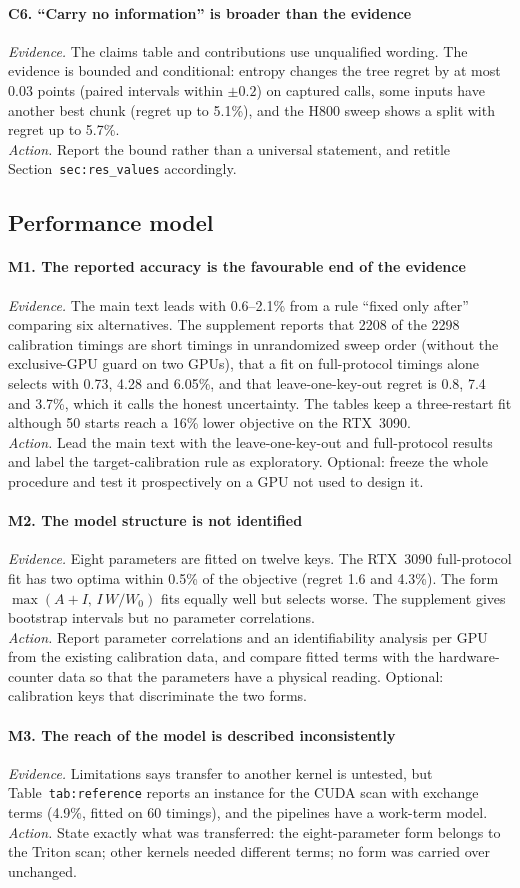 \documentclass[11pt]{article}
\newcommand{\finding}[2]{\paragraph{#1. #2}}
\newcommand{\evidence}{\textit{Evidence.} }
\newcommand{\action}{\textit{Action.} }
\begin{document}
\finding{C6}{``Carry no information'' is broader than the evidence}
\evidence The claims table and contributions use unqualified wording. The evidence is
bounded and conditional: entropy changes the tree regret by at most 0.03 points (paired
intervals within $\pm0.2$) on captured calls, some inputs have another best chunk (regret
up to 5.1\%), and the H800 sweep shows a split with regret up to 5.7\%.\\
\action Report the bound rather than a universal statement, and retitle
Section~\texttt{sec:res\_values} accordingly.

\subsection*{Performance model}

\finding{M1}{The reported accuracy is the favourable end of the evidence}
\evidence The main text leads with 0.6--2.1\% from a rule ``fixed only after'' comparing
six alternatives. The supplement reports that 2208 of the 2298 calibration timings are
short timings in unrandomized sweep order (without the exclusive-GPU guard on two GPUs),
that a fit on full-protocol timings alone selects with 0.73, 4.28 and 6.05\%, and that
leave-one-key-out regret is 0.8, 7.4 and 3.7\%, which it calls the honest uncertainty. The
tables keep a three-restart fit although 50 starts reach a 16\% lower objective on the
RTX~3090.\\
\action Lead the main text with the leave-one-key-out and full-protocol results and label
the target-calibration rule as exploratory. Optional: freeze the whole procedure and test
it prospectively on a GPU not used to design it.

\finding{M2}{The model structure is not identified}
\evidence Eight parameters are fitted on twelve keys. The RTX~3090 full-protocol fit has
two optima within 0.5\% of the objective (regret 1.6 and 4.3\%). The form
$\max(A+I,\,I\,W/W_0)$ fits equally well but selects worse. The supplement gives bootstrap
intervals but no parameter correlations.\\
\action Report parameter correlations and an identifiability analysis per GPU from the
existing calibration data, and compare fitted terms with the hardware-counter data so that
the parameters have a physical reading. Optional: calibration keys that discriminate the
two forms.

\finding{M3}{The reach of the model is described inconsistently}
\evidence Limitations says transfer to another kernel is untested, but
Table~\texttt{tab:reference} reports an instance for the CUDA scan with exchange terms
(4.9\%, fitted on 60 timings), and the pipelines have a work-term model.\\
\action State exactly what was transferred: the eight-parameter form belongs to the Triton
scan; other kernels needed different terms; no form was carried over unchanged.
\end{document}
